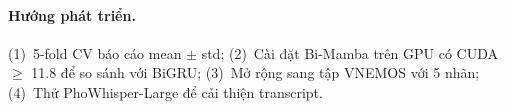 \documentclass[runningheads]{llncs}
\begin{document}
\paragraph{Hướng phát triển.}
(1)~5-fold CV báo cáo mean $\pm$ std;
(2)~Cài đặt Bi-Mamba trên GPU có CUDA $\geq$ 11.8 để so sánh với BiGRU;
(3)~Mở rộng sang tập VNEMOS với 5 nhãn;
(4)~Thử PhoWhisper-Large để cải thiện transcript.

\FloatBarrier
\clearpage


\end{document}
